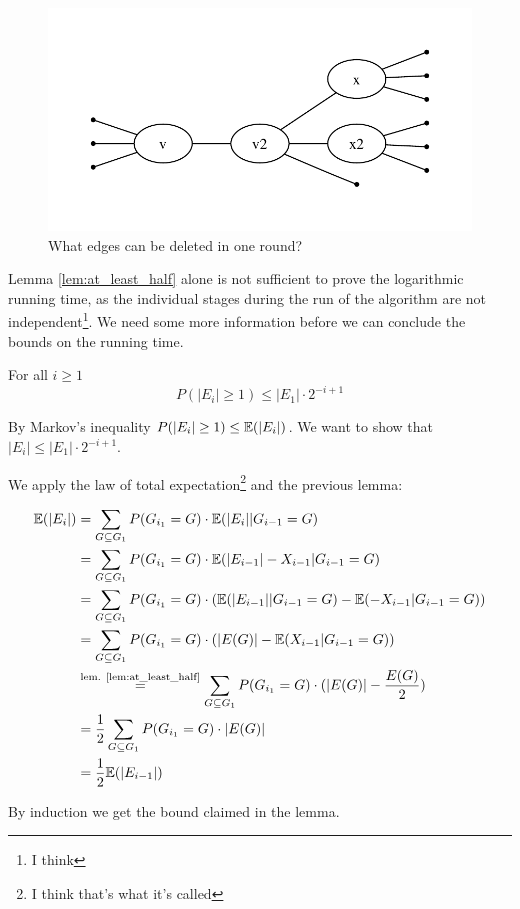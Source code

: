 \begin{pr}
\begin{figure}
\begin{center}
\includegraphics{./images/randomized_matching_delete_edge}
\end{center}
\caption{What edges can be deleted in one round?}
\label{fig:at_least_half}
\end{figure}
\end{pr}

Lemma \ref{lem:at_least_half} alone is not sufficient to prove the logarithmic running time, as the individual stages during the run of the algorithm are not independent\footnote{I think}. We need some more information before we can conclude the bounds on the running time.

\begin{lem} For all $i\geq 1$
\[P(|E_i| \geq 1) \leq |E_1| \cdot 2^{-i+1}\]
\end{lem}

\begin{pr} By Markov's inequality $P(|E_i| \geq 1) \leq \mathbb{E}(|E_i|)$. We want to show that $|E_i|\leq |E_1|\cdot 2^{-i+1}$.

We apply the law of total expectation\footnote{I think that's what it's called} and the previous lemma:

\begin{align*}
\mathbb{E}(|E_i|) &= \sum_{G\subseteq G_1} P(G_{i_1} =G) \cdot \mathbb{E}(|E_i| | G_{i-1}=G)\\
	&=\sum_{G\subseteq G_1}  P(G_{i_1} =G) \cdot \mathbb{E}(|E_{i-1}| -X_{i-1} | G_{i-1}=G)\\
	&=\sum_{G\subseteq G_1}  P(G_{i_1} =G) \cdot (\mathbb{E}(|E_{i-1}| | G_{i-1}=G) - \mathbb{E}( -X_{i-1} | G_{i-1}=G))\\
	&=\sum_{G\subseteq G_1}  P(G_{i_1} =G) \cdot (|E(G)| - \mathbb{E}(X_{i-1} | G_{i-1}=G))\\
	&\stackrel{\text{lem. \ref{lem:at_least_half}}}{=} \sum_{G\subseteq G_1}  P(G_{i_1} =G) \cdot (|E(G)| - \frac{E(G)}{2})\\
	&=\frac 12 \sum_{G\subseteq G_1}  P(G_{i_1} =G) \cdot |E(G)|\\
	&=\frac 12 \mathbb{E}(|E_{i-1}|)\\
\end{align*}

By induction we get the bound claimed in the lemma.
\end{pr}

